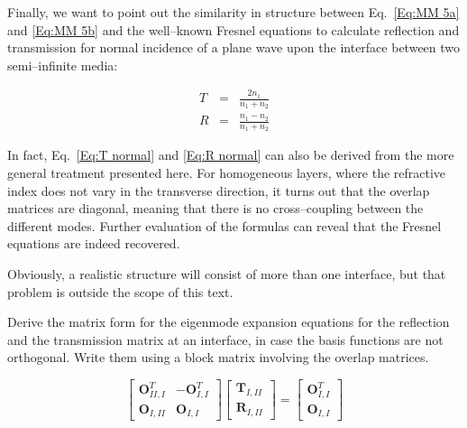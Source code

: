 Finally, we want to point out the similarity in structure between Eq.~\ref{Eq:MM 5a} and \ref{Eq:MM 5b} and the well--known Fresnel equations to calculate reflection and transmission for normal incidence of a plane wave upon the interface between two semi--infinite media:

\begin{eqnarray}
T & = & \frac{2n_{1}}{n_{1}+n_{2}}\label{Eq:T normal} \\
R & = & \frac{n_{1}-n_{2}}{n_{1}+n_{2}}\label{Eq:R normal} 
\end{eqnarray}

In fact, Eq.~\ref{Eq:T normal} and \ref{Eq:R normal} can also be derived from the more general treatment presented here. For homogeneous layers, where the refractive index does not vary in the transverse direction, it turns out that the overlap matrices are diagonal, meaning that there is no cross--coupling between the different modes. Further evaluation of the formulas can reveal that the Fresnel equations are indeed recovered.

Obviously, a realistic structure will consist of more than one interface, but that problem is outside the scope of this text.


\begin{exer}
Derive the matrix form for the eigenmode expansion equations for the reflection and the transmission matrix at an interface, in case the basis functions are not orthogonal. Write them using a block matrix involving the overlap matrices.

\begin{sol}
$$ \begin{bmatrix} \mathbf{O}^{T}_{II,I} & -\mathbf{O}^{T}_{I,I} \\ \mathbf{O}_{I,II} & \mathbf{O}_{I,I} \end{bmatrix} \begin{bmatrix} \mathbf{T}_{I,II} \\ \mathbf{R}_{I,II} \end{bmatrix} =  \begin{bmatrix} \mathbf{O}^{T}_{I,I} \\ \mathbf{O}_{I,I} \end{bmatrix} $$
\end{sol}

\end{exer}


\pagebreak



